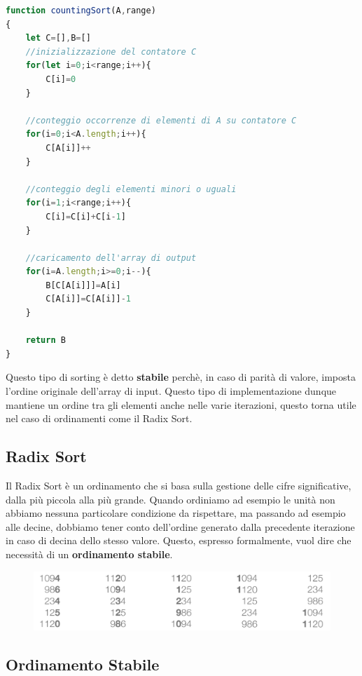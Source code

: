 \documentclass{article}
\begin{document}
\newpage

\begin{lstlisting}[language=JavaScript]
function countingSort(A,range)
{
    let C=[],B=[]
    //inizializzazione del contatore C
    for(let i=0;i<range;i++){
        C[i]=0
    }

    //conteggio occorrenze di elementi di A su contatore C
    for(i=0;i<A.length;i++){
        C[A[i]]++
    }

    //conteggio degli elementi minori o uguali
    for(i=1;i<range;i++){
        C[i]=C[i]+C[i-1]
    }

    //caricamento dell'array di output
    for(i=A.length;i>=0;i--){
        B[C[A[i]]]=A[i]
        C[A[i]]=C[A[i]]-1
    }

    return B
}
\end{lstlisting}

Questo tipo di sorting è detto \textbf{stabile} perchè, in caso di parità di valore, imposta l'ordine originale dell'array di input. Questo tipo di implementazione dunque mantiene un ordine tra gli elementi anche nelle varie iterazioni, questo torna utile nel caso di ordinamenti come il Radix Sort.

\subsection{Radix Sort} Il Radix Sort è un ordinamento che si basa sulla gestione delle cifre significative, dalla più piccola alla più grande. Quando ordiniamo ad esempio le unità non abbiamo nessuna particolare condizione da rispettare, ma passando ad esempio alle decine, dobbiamo tener conto dell'ordine generato dalla precedente iterazione in caso di decina dello stesso valore. Questo, espresso formalmente, vuol dire che necessità di un \textbf{ordinamento stabile}.

\begin{figure}[htbp]
        \center
        \includegraphics[scale=0.4]{img/radixSort1.png}
    \end{figure}

\newpage

\subsection{Ordinamento Stabile}
\end{document}
